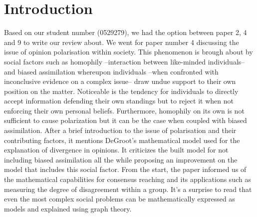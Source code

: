 \documentclass[14]{article}
\begin{document}
\author{\textbf{Faculty of Sciences and Bio-Engineering Sciences}\\[2\baselineskip]\newline\textbf{Arthur Chomé - 0529279}}

\date{ \LARGE Assignment 3: Review}
\title{\vspace{-6cm}}%

\maketitle

\section{Introduction}
Based on our student number (0529279), we had the option between paper 2, 4 and 9 to write our review about. We went for paper number 4\cite{dandekar2013biased} discussing the issue of opinion polarisation within society. 
This phenomenon is brough about by social factors such as homophily --interaction between like-minded individuals-- and biased assimilation whereupon individuals --when confronted with inconclusive evidence on a complex issue-- draw undue support to their own position on the matter. Noticeable is the tendency for individuals to directly accept information defending their own standings but to reject it when not enforcing their own personal beliefs. Furthermore, homophily on its own is not sufficient to cause polarization but it can be the case when coupled with biased assimilation.
\newline
After a brief introduction to the issue of polarisation and their contributing factors, it mentions DeGroot's mathematical model\cite{degroot1974reaching} used for the explanation of divergence in opinions. It criticizes the built model for not including biased assimilation all the while proposing an improvement on the model that includes this social factor. From the start, the paper informed us of the mathematical capabilities for consensus reaching and its applications such as measuring the degree of disagreement within a group. It's a surprise to read that even the most complex social problems can be mathematically expressed as models and explained using graph theory.

\end{document}
